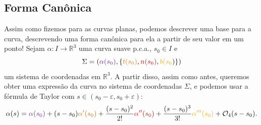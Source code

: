 \documentclass[../differential_geometry.tex]{subfiles}
\begin{document}
\subsection{Forma Canônica}
Assim como fizemos para as curvas planas, podemos descrever uma base para a curva, descrevendo uma forma canônica para ela a partir de seu valor em um ponto! Sejam \(\alpha :I\rightarrow \mathbb{R}^{3} \) uma curva suave p.c.a., \(s_{0}\in I\) e
\[
	\Sigma = ({\color{DarkOrchid4}\alpha (s_{0})}, \{{\color{DarkOrange2}t(s_{0})}, {\color{Red3}n(s_{0})}, {\color{DarkGoldenrod2}b(s_{0}})\})
\]
um sistema de coordenadas em \(\mathbb{R}^{3}\). A partir disso, assim como antes, queremos obter uma expressão da curva no sistema de coordenadas \(\Sigma\), e podemos usar a fórmula de Taylor com \(s\in (s_{0}-\varepsilon , s_{0}+\varepsilon )\):
\[
	\alpha (s)={\color{DarkOrchid4}\alpha(s_{0})}+(s-s_{0}){\color{DarkOrange3}\alpha '(s_{0})}+\frac{(s-s_{0})^{2}}{2!}{\color{Red3}\alpha ''(s_{0})}+\frac{(s-s_{0})^{3}}{3!}{\color{DarkGoldenrod2}\alpha '''(s_{0})}+\mathcal{O}_{4}(s-s_{0}).
\]
\end{document}

